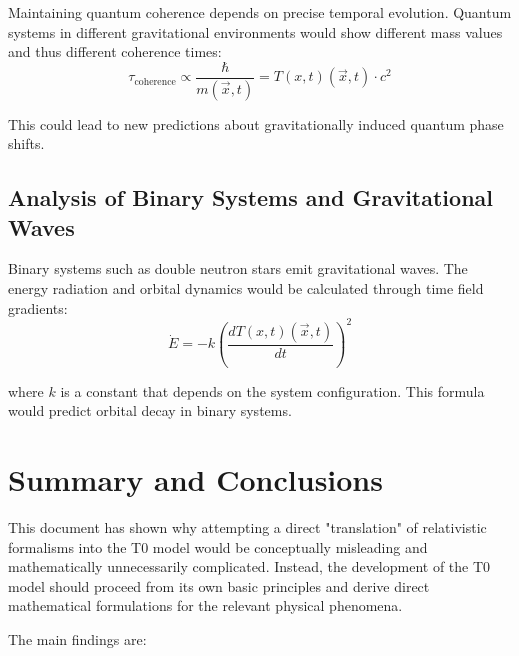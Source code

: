 \documentclass[12pt,a4paper]{article}
\newcommand{\Tfieldt}{T(x,t)}
\newcommand{\vecx}{\vec{x}}
\begin{document}
	Maintaining quantum coherence depends on precise temporal evolution. Quantum systems in different gravitational environments would show different mass values and thus different coherence times:
	\begin{equation}
		\tau_{\text{coherence}} \propto \frac{\hbar}{m(\vecx,t)} = \Tfieldt(\vecx,t) \cdot c^2
	\end{equation}
	
	This could lead to new predictions about gravitationally induced quantum phase shifts.
	
	\subsection{Analysis of Binary Systems and Gravitational Waves}
	\label{subsec:binary_systems}
	
	Binary systems such as double neutron stars emit gravitational waves. The energy radiation and orbital dynamics would be calculated through time field gradients:
	\begin{equation}
		\dot{E} = -k \left(\frac{d\Tfieldt(\vecx,t)}{dt}\right)^2
	\end{equation}
	
	where $k$ is a constant that depends on the system configuration. This formula would predict orbital decay in binary systems.
	
	\section{Summary and Conclusions}
	\label{sec:conclusion}
	
	This document has shown why attempting a direct "translation" of relativistic formalisms into the T0 model would be conceptually misleading and mathematically unnecessarily complicated. Instead, the development of the T0 model should proceed from its own basic principles and derive direct mathematical formulations for the relevant physical phenomena.
	
	The main findings are:
	
\end{document}
